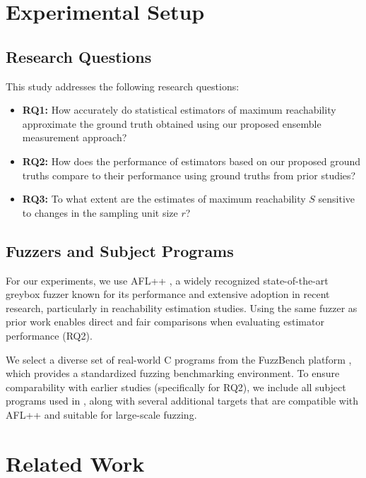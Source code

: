 \documentclass[conference]{IEEEtran}
\begin{document}
\section{Experimental Setup} \label{sec:setup}

\subsection{Research Questions}

This study addresses the following research questions:

\begin{itemize}
    \item \textbf{RQ1:} How accurately do statistical estimators of maximum reachability approximate the ground truth obtained using our proposed ensemble measurement approach?
    
    \item \textbf{RQ2:} How does the performance of estimators based on our proposed ground truths compare to their performance using ground truths from prior studies?
    
    \item \textbf{RQ3:} To what extent are the estimates of maximum reachability $S$ sensitive to changes in the sampling unit size $r$?
\end{itemize}

\subsection{Fuzzers and Subject Programs}

For our experiments, we use AFL++ \cite{aflpp}, a widely recognized state-of-the-art greybox fuzzer known for its performance and extensive adoption in recent research, particularly in reachability estimation studies. Using the same fuzzer as prior work enables direct and fair comparisons when evaluating estimator performance (RQ2).

We select a diverse set of real-world C programs from the FuzzBench platform \cite{metzman2021fuzzbench}, which provides a standardized fuzzing benchmarking environment. To ensure comparability with earlier studies (specifically for RQ2), we include all subject programs used in \cite{reachability_2023}, along with several additional targets that are compatible with AFL++ and suitable for large-scale fuzzing.


\section{Related Work}
\end{document}
